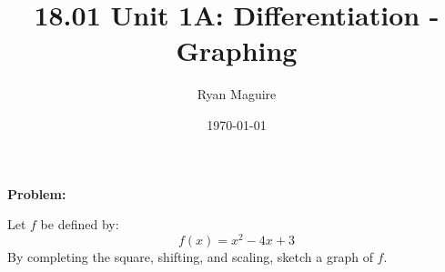 \documentclass{article}
\title{18.01 Unit 1A: Differentiation - Graphing}
\author{Ryan Maguire}
\date{\today}
\newif\ifsolution
\begin{document}
    \maketitle
    \textbf{Problem:}
    \par\hfill\par
    Let $f$ be defined by:
    \[
        f(x)=x^{2}-4x+3
    \]
    By completing the square, shifting, and scaling, sketch a graph of
    $f$.
    \par\hfill\par
    \ifsolution
        \color{blue}
        \textbf{Solution:}
        \par\hfill\par
        We can factor $f$ directly, obtaining:
        \[
            f(x)=(x-3)(x-1)
        \]
        which tells us the roots of $f$ are $x=1$ and $x=3$. Let's complete
        the square. We have:
        \[
            x^{2}-4x=(x-2)^{2}-4
        \]
        And hence:
        \[
            f(x)=x^{2}-4x+3=(x-2)^{2}-1
        \]
        We know what the graph of $y=x^{2}$ looks like, it is an ordinary
        parabola. This final formula tells us we are shifting this familiar
        image vertically \textit{downwards} by 1 and horizontally to the
        \textit{right} by 2. This creates the image below.
        \begin{figure}
            \centering
            \texttt{[image: completing\_the\_square\_and\_graphing\_001]}
            \caption{Graph of $f$}
        \end{figure}
    \fi
\end{document}
